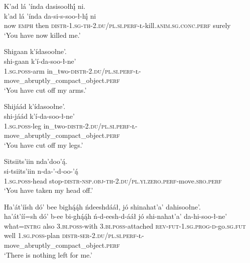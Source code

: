 \ea\label{ex:text8-2-9}
K’ad lá ’índa dasisoołhį́ ni.\\
\gll k’ad	lá	’índa	da-si-s-soo-ł-hį́	ni\\
     now	\textsc{emph}	then	\textsc{distr}-1.\textsc{sg}-\textsc{th}-2.\textsc{du}/\textsc{pl}.\textsc{si}.\textsc{perf}-\textsc{ł}-kill.\textsc{anim}.\textsc{sg}.\textsc{conc}.\textsc{perf}	surely\\
\glt `You have now killed me.'
\z

\ea\label{ex:text8-2-10}
Shigaan k’ídasoołne’.\\
\gll shi-gaan	k’í-da-soo-ł-ne’\\
     1.\textsc{sg}.\textsc{poss}-arm	in\_two-\textsc{distr}-2.\textsc{du}/\textsc{pl}.\textsc{si}.\textsc{perf}-\textsc{ł}-move\_abruptly\_compact\_object.\textsc{perf}\\
\glt `You have cut off my arms.'
\z

\ea\label{ex:text8-2-11}
Shijáád k’ídasoołne’.\\
\gll shi-jáád	k’í-da-soo-ł-ne’\\
     1.\textsc{sg}.\textsc{poss}-leg	in\_two-\textsc{distr}-2.\textsc{du}/\textsc{pl}.\textsc{si}.\textsc{perf}-\textsc{ł}-move\_abruptly\_compact\_object.\textsc{perf}\\
\glt `You have cut off my legs.'
\z

\ea\label{ex:text8-2-12}
Sitsiits’iin nda’doo’ą́.\\
\gll si-tsiits’iin	n-da-’-d-oo-’ą́\\
     1.\textsc{sg}.\textsc{poss}-head	stop-\textsc{distr}-\textsc{nsp}.\textsc{obj}-\textsc{th}-2.\textsc{du}/\textsc{pl}.\textsc{yi}.\textsc{zero}.\textsc{perf}-move.\textsc{sro}.\textsc{perf}\\
\glt `You have taken my head off.'
\z

\ea\label{ex:text8-2-13}
Ha’át’íísh dó’ bee bighą́ą́h ńdeeshdááł, jó shinahat’a’ dahisoołne’.\\
\gll ha’át’íí=sh	dó’	b-ee	bi-ghą́ą́h	ń-d-eesh-d-ááł	jó	shi-nahat’a’	da-hi-soo-ł-ne’\\
     what=\textsc{intrg}	also	3.\textsc{bi}.\textsc{poss}-with	3.\textsc{bi}.\textsc{poss}-attached	\textsc{rev}-\textsc{fut}-1.\textsc{sg}.\textsc{prog}-\textsc{d}-go.\textsc{sg}.\textsc{fut}	well	1.\textsc{sg}.\textsc{poss}-plan	\textsc{distr}-\textsc{ser}-2.\textsc{du}/\textsc{pl}.\textsc{si}.\textsc{perf}-\textsc{ł}-move\_abruptly\_compact\_object.\textsc{perf}\\
\glt `There is nothing left for me.'
\z

